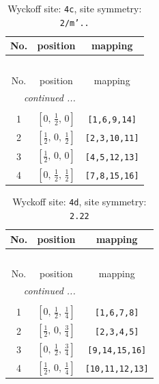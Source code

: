 \documentclass[fleqn,8pt]{jsarticle}
\begin{document}
\renewcommand{\arraystretch}{1.2}
\begin{longtable}{ccc}
\caption{Wyckoff site: {\tt 4c}, site symmetry: {\tt 2/m'..}}
 \\
 \hline \hline
No. & position & mapping \\ \hline \endfirsthead

\multicolumn{2}{l}{\tablename\ \thetable{}} \\
 \hline \hline
No. & position & mapping \\ \hline \endhead

 \hline \hline
\multicolumn{2}{r}{\footnotesize\it continued ...} \\ \endfoot

 \hline \hline
\multicolumn{2}{r}{} \\ \endlastfoot

1 & $\left[ 0,\, \frac{1}{2},\, 0 \right]$ & {\tt [1,6,9,14]} \\ \hline
2 & $\left[ \frac{1}{2},\, 0,\, \frac{1}{2} \right]$ & {\tt [2,3,10,11]} \\ \hline
3 & $\left[ \frac{1}{2},\, 0,\, 0 \right]$ & {\tt [4,5,12,13]} \\ \hline
4 & $\left[ 0,\, \frac{1}{2},\, \frac{1}{2} \right]$ & {\tt [7,8,15,16]} \\
\end{longtable}
\renewcommand{\arraystretch}{1.2}
\begin{longtable}{ccc}
\caption{Wyckoff site: {\tt 4d}, site symmetry: {\tt 2.22}}
 \\
 \hline \hline
No. & position & mapping \\ \hline \endfirsthead

\multicolumn{2}{l}{\tablename\ \thetable{}} \\
 \hline \hline
No. & position & mapping \\ \hline \endhead

 \hline \hline
\multicolumn{2}{r}{\footnotesize\it continued ...} \\ \endfoot

 \hline \hline
\multicolumn{2}{r}{} \\ \endlastfoot

1 & $\left[ 0,\, \frac{1}{2},\, \frac{1}{4} \right]$ & {\tt [1,6,7,8]} \\ \hline
2 & $\left[ \frac{1}{2},\, 0,\, \frac{3}{4} \right]$ & {\tt [2,3,4,5]} \\ \hline
3 & $\left[ 0,\, \frac{1}{2},\, \frac{3}{4} \right]$ & {\tt [9,14,15,16]} \\ \hline
4 & $\left[ \frac{1}{2},\, 0,\, \frac{1}{4} \right]$ & {\tt [10,11,12,13]} \\
\end{longtable}
\end{document}
